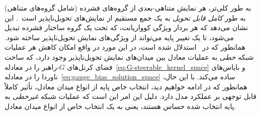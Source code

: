به طور کلی‌تر، هر نمایش متناهی-بعدی از گروه‌های فشرده (شامل گروه‌های متناهی) به طور \emph{کامل قابل تحویل} به یک جمع مستقیم از نمایش‌های تحویل‌ناپذیر است~\cite{gallier2019harmonicRepr,din2017reprLectureNotes,serre1977linear}.
این نشان می‌دهد که هر بردار ویژگی کوواریانت، که تحت یک گروه ساختار فشرده تبدیل می‌شود، تا یک تغییر پایه می‌تواند از ویژگی‌های نمایش تحویل‌ناپذیر ساخته شود.
همانطور که در~\cite{Weiler2019_E2CNN} استدلال شده است، در این مورد در واقع امکان کاهش هر عملیات شبکه \emph{خطی} به عملیات معادل بین میدان‌های نمایش تحویل‌ناپذیر وجود دارد، که ساخت فضای کرنل‌های $G$-راهبر را در معادله~\eqref{eq:G-steerable_kernel_space} و بایاس‌های ناوردا را در معادله~\eqref{eq:gauge_bias_solution_space} ساده می‌کند.
با این حال، همانطور که در ادامه خواهیم دید، انتخاب خاص پایه از انواع میدان معادل، تأثیر کاملاً قابل توجهی بر عملکرد مدل دارد.
دلیل این امر این است که عملیات شبکه \emph{غیرخطی} به پایه انتخاب شده حساس هستند، یعنی به یک انتخاب خاص از انواع میدان معادل.